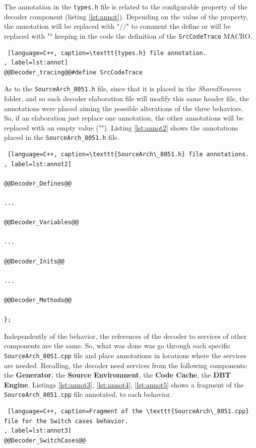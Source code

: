 \documentclass[12pt]{article}
\begin{document}
{The annotation in the \texttt{types.h} file is related to the configurable property of the decoder component (listing \ref{lst:annot}). Depending on the value of the property, the annotation will be replaced with "//" to comment the define or will be replaced with "" keeping in the code the definition of the \texttt{SrcCodeTrace} MACRO.

\begin{lstlisting} [language=C++, caption=\texttt{types.h} file annotation.
, label=lst:annot]
@@Decoder_tracing@@#define SrcCodeTrace
\end{lstlisting}

As to the \texttt{SourceArch\_8051.h} file, since that it is placed in the \textit{SharedSources} folder, and so each decoder elaboration file will modify this same header file, the annotations were placed aiming the possible alterations of the three behaviors. So, if an elaboration just replace one annotation, the other annotations will be replaced with an empty value (""). Listing \ref{lst:annot2} shows the annotations placed in the \texttt{SourceArch\_8051.h} file.

\begin{lstlisting} [language=C++, caption=\texttt{SourceArch\_8051.h} file annotations.
, label=lst:annot2]

@@Decoder_Defines@@

...

@@Decoder_Variables@@

...

@@Decoder_Inits@@

...

@@Decoder_Methods@@ 

};
\end{lstlisting}


Independently of the behavior, the references of the decoder to services of other components are the same. So, what was done was go through each specific \texttt{SourceArch\_8051.cpp} file and place annotations in locations where the services are needed. Recalling, the decoder need services from the following components: the \textbf{Generator}, the \textbf{Source Environment}, the \textbf{Code Cache}, the \textbf{DBT Engine}. Listings \ref{lst:annot3}, \ref{lst:annot4}, \ref{lst:annot5} shows a fragment of the \texttt{SourceArch\_8051.cpp} file annotated, to each behavior.


\begin{lstlisting} [language=C++, caption=Fragment of the \texttt{SourceArch\_8051.cpp} file for the Switch cases behavior.
, label=lst:annot3]
@@Decoder_SwitchCases@@


\end{lstlisting}}
\end{document}
